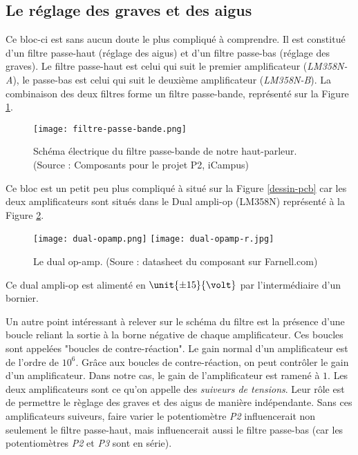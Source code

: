 \subsection{Le réglage des graves et des aigus}
Ce bloc-ci est sans aucun doute le plus compliqué à comprendre. Il est constitué d'un 
filtre passe-haut (réglage des aigus) et d'un filtre passe-bas (réglage des graves).
Le filtre passe-haut est celui qui suit le premier amplificateur (\textit{LM358N-A}),
le passe-bas est celui qui suit le deuxième amplificateur (\textit{LM358N-B}). 
La combinaison des deux filtres forme un filtre passe-bande, représenté sur la
Figure \ref{filtre}. 

\begin{figure}[!hbt]
	\centering
	\texttt{[image: filtre-passe-bande.png]}
	\caption{Schéma électrique du filtre passe-bande de notre haut-parleur.
	(Source : Composants pour le projet P2, iCampus)}
	\label{filtre}
\end{figure}

Ce bloc est un petit peu plus compliqué à situé sur la Figure
\ref{dessin-pcb} car les deux amplificateurs sont situés dans le Dual ampli-op (LM358N) 
représenté à la Figure \ref{dual-ampli-op}. 

\begin{figure}[!hbt]
	\centering
	\texttt{[image: dual-opamp.png]}
	\texttt{[image: dual-opamp-r.jpg]}
	\caption{Le dual op-amp. (Soure : datasheet du composant sur Farnell.com)}
	\label{dual-ampli-op}
\end{figure}

Ce dual ampli-op est alimenté en $\unit{\pm15}{\volt}$ par l'intermédiaire
d'un bornier.

Un autre point intéressant à relever sur le schéma du filtre est la présence d'une boucle 
reliant la sortie à la borne négative de chaque amplificateur. Ces boucles sont appelées
"boucles de contre-réaction".  Le gain normal d'un amplificateur est de l'ordre de $10^{6}$. 
Grâce aux boucles de contre-réaction, on peut contrôler le gain d'un amplificateur. 
Dans notre cas, le gain de l'amplificateur est ramené à $1$. 
Les deux amplificateurs sont ce qu'on appelle des \textit{suiveurs de tensions}. 
Leur rôle est de permettre le règlage des graves et des aigus de manière indépendante.
Sans ces amplificateurs suiveurs, faire varier le potentiomètre \textit{P2} influencerait 
non seulement le filtre passe-haut, mais influencerait aussi le filtre passe-bas 
(car les potentiomètres \textit{P2} et \textit{P3} sont en série).

